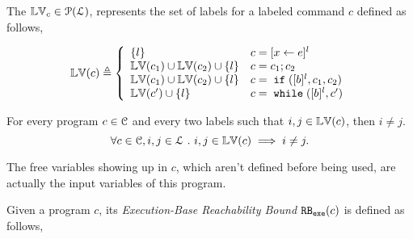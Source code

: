 The $\mathbb{LV}_c \in \mathcal{P}(\mathcal{L})$,
represents the set of labels
for a labeled command $c$ defined as follows,
%
\begin{defn}
\label{def:lvar}
{\small
$$
 \lvar(c) \triangleq
 \left\{
 \begin{array}{ll}
 \{l\} 
 & {c} = [{\assign x e}]^{l} 
 \\
 \lvar({c_1}) \cup \lvar({{c_2}}) \cup \{l\} 
 & {c} = {c_1};{c_2}
 \\
 \lvar(c_1) \cup \lvar({{c_2}}) \cup \{l\} 
 & {c} =\eif([\bexpr]^{l}, c_1, c_2) 
 \\
 \lvar({{c}'}) \cup \{l\} 
 & {c} = \ewhile ([\bexpr]^{l}, {c}')
\end{array}
\right.
$$
}
\end{defn}
%
\begin{lem}
 \label{lem:label_unique}
 For every program $c \in \mathcal{C}$ and every two labels such that
 $i, j \in \mathbb{LV}(c)$, then $i \neq j$.
 \[
 \forall c \in \mathcal{C}, i, j \in \mathcal{L} ~.~ i, j \in \mathbb{LV}(c)\implies i \neq j.
 \]
\end{lem}
%
The free variables
showing up in $c$, which aren't defined before being used, are actually the input variables of this program.
%
\begin{defn}
 \label{def:exe_rb}
 Given a program ${c}$,
its \emph{Execution-Base Reachability Bound} 
$\mathtt{RB_{exe}}({c})$ is defined as follows,
%
\highlight{
\[
\begin{array}{l}
 \exeRB({c}) \triangleq
 \Big\{ 
 (l, w) 
 ~ \vert ~ 
 w : \mathcal{T} \to \mathbb{N}
 \land
 l \in \lvar(c) 
 \\ \qquad \qquad \qquad \qquad
 \land
 \forall \trace_0 \in \mathcal{T}_0(c), \trace \in \mathcal{T} \st
 \config{{c}, \trace} \to^{*} \config{\eskip, \trace_0 \tracecat \vtrace} 
 \implies w(\trace_0) = \vcounter(\vtrace, l) 
\Big\}
\end{array}
\]
}
\end{defn}
